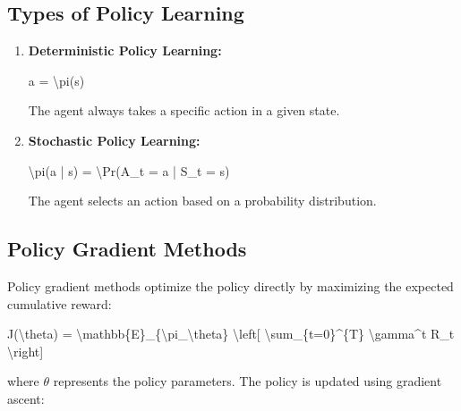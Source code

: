 \documentclass[
]{book}
\newenvironment{Shaded}{\begin{snugshade}}{\end{snugshade}}
\newcommand{\NormalTok}[1]{#1}
\begin{document}
\subsection{\texorpdfstring{\textbf{Types of Policy Learning}}{Types of Policy Learning}}\label{types-of-policy-learning}

\begin{enumerate}
\def\labelenumi{\arabic{enumi}.}
\item
  \textbf{Deterministic Policy Learning:}

\begin{Shaded}
\begin{Highlighting}[]
\NormalTok{a = \textbackslash{}pi(s)}
\end{Highlighting}
\end{Shaded}

  The agent always takes a specific action in a given state.
\item
  \textbf{Stochastic Policy Learning:}

\begin{Shaded}
\begin{Highlighting}[]
\NormalTok{\textbackslash{}pi(a | s) = \textbackslash{}Pr(A\_t = a | S\_t = s)}
\end{Highlighting}
\end{Shaded}

  The agent selects an action based on a probability distribution.
\end{enumerate}

\subsection{\texorpdfstring{\textbf{Policy Gradient Methods}}{Policy Gradient Methods}}\label{policy-gradient-methods-1}

Policy gradient methods optimize the policy directly by maximizing the expected cumulative reward:

\begin{Shaded}
\begin{Highlighting}[]
\NormalTok{J(\textbackslash{}theta) = \textbackslash{}mathbb\{E\}\_\{\textbackslash{}pi\_\textbackslash{}theta\} \textbackslash{}left[ \textbackslash{}sum\_\{t=0\}\^{}\{T\} \textbackslash{}gamma\^{}t R\_t \textbackslash{}right]}
\end{Highlighting}
\end{Shaded}

where \(\theta\) represents the policy parameters. The policy is updated using gradient ascent:
\end{document}

